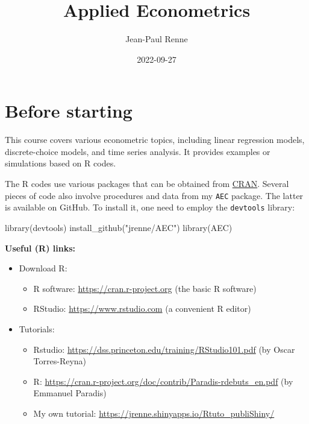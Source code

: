 \documentclass[
  12pt,
]{book}
\title{Applied Econometrics}
\author{Jean-Paul Renne}
\date{2022-09-27}
\newenvironment{Shaded}{\begin{snugshade}}{\end{snugshade}}
\newcommand{\FunctionTok}[1]{\textcolor[rgb]{0.00,0.00,0.00}{#1}}
\newcommand{\NormalTok}[1]{#1}
\newcommand{\StringTok}[1]{\textcolor[rgb]{0.31,0.60,0.02}{#1}}
\providecommand{\tightlist}{%
  \setlength{\itemsep}{0pt}\setlength{\parskip}{0pt}}
\theoremstyle{definition}
\theoremstyle{definition}
\theoremstyle{definition}
\theoremstyle{definition}
\theoremstyle{remark}
\begin{document}
\maketitle

{
\setcounter{tocdepth}{1}
\tableofcontents
}
\newcommand{\bv}[1]{\mathbf{#1}}

\hypertarget{intro}{%
\chapter{Before starting}\label{intro}}

This course covers various econometric topics, including linear regression models, discrete-choice models, and time series analysis. It provides examples or simulations based on R codes.

The R codes use various packages that can be obtained from \href{https://cran.r-project.org}{CRAN}. Several pieces of code also involve procedures and data from my \texttt{AEC} package. The latter is available on GitHub. To install it, one need to employ the \texttt{devtools} library:

\begin{Shaded}
\begin{Highlighting}[]
\FunctionTok{library}\NormalTok{(devtools)}
\FunctionTok{install\_github}\NormalTok{(}\StringTok{"jrenne/AEC"}\NormalTok{)}
\FunctionTok{library}\NormalTok{(AEC)}
\end{Highlighting}
\end{Shaded}

\textbf{Useful (R) links:}

\begin{itemize}
\item
  Download R:

  \begin{itemize}
  \tightlist
  \item
    R software: \url{https://cran.r-project.org} (the basic R software)
  \item
    RStudio: \url{https://www.rstudio.com} (a convenient R editor)
  \end{itemize}
\item
  Tutorials:

  \begin{itemize}
  \tightlist
  \item
    Rstudio: \url{https://dss.princeton.edu/training/RStudio101.pdf} (by Oscar Torres-Reyna)
  \item
    R: \url{https://cran.r-project.org/doc/contrib/Paradis-rdebuts_en.pdf} (by Emmanuel Paradis)
  \item
    My own tutorial: \url{https://jrenne.shinyapps.io/Rtuto_publiShiny/}
  \end{itemize}
\end{itemize}
\end{document}
